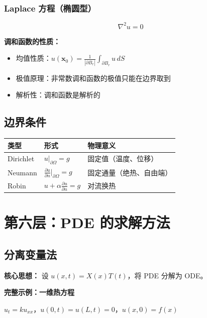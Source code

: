\subsubsection{Laplace 方程（椭圆型）}

\[
\nabla^2 u = 0
\]

\textbf{调和函数的性质：}
\begin{itemize}
  \item 均值性质：$u(\mathbf{x}_0) = \frac{1}{|\partial B_r|}\int_{\partial B_r} u\,dS$
  \item 极值原理：非常数调和函数的极值只能在边界取到
  \item 解析性：调和函数是解析的
\end{itemize}

\subsection{边界条件}

\begin{center}
\begin{tabular}{L{2.5cm}L{4cm}L{5cm}}
\toprule
\textbf{类型} & \textbf{形式} & \textbf{物理意义} \\
\midrule
Dirichlet & $u|_{\partial\Omega} = g$ & 固定值（温度、位移） \\
Neumann & $\frac{\partial u}{\partial n}\big|_{\partial\Omega} = g$ & 固定通量（绝热、自由端） \\
Robin & $u + \alpha\frac{\partial u}{\partial n} = g$ & 对流换热 \\
\bottomrule
\end{tabular}
\end{center}

\section{第六层：PDE 的求解方法}

\subsection{分离变量法}

\textbf{核心思想：} 设 $u(x,t) = X(x)T(t)$，将 PDE 分解为 ODE。

\textbf{完整示例：一维热方程}

$u_t = ku_{xx}$，$u(0,t) = u(L,t) = 0$，$u(x,0) = f(x)$

